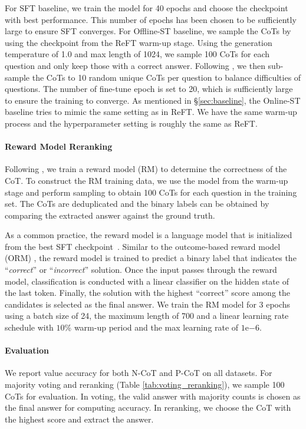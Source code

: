 For SFT baseline, we train the model for 40 epochs and choose the checkpoint with best performance. 
This number of epochs has been chosen to be sufficiently large to ensure SFT converges.
For Offline-ST baseline, we sample the CoTs by using the checkpoint from the ReFT warm-up stage.
Using the generation temperature of 1.0 and max length of 1024, we sample 100 CoTs for each question and only keep those with a correct answer. 
Following \citet{singh2023human}, we then sub-sample the CoTs to 10 random unique CoTs per question to balance difficulties of questions.
The number of fine-tune epoch is set to 20, which is sufficiently large to ensure the training to converge.
As mentioned in \S\ref{sec:baseline}, the Online-ST baseline tries to mimic the same setting as in ReFT. 
We have the same warm-up process and the hyperparameter setting is roughly the same as ReFT.

\paragraph{Reward Model Reranking}
\label{sec:reward_model_reranking}
Following \cite{cobbe2021training,uesato2022solving}, we train a reward model (RM) to determine the correctness of the CoT. 
To construct the RM training data, we use the model from the warm-up stage and perform sampling to obtain 100 CoTs for each question in the training set.
The CoTs are deduplicated and the binary labels can be obtained by comparing the extracted answer against the ground truth.

As a common practice, the reward model is a language model that is initialized from the best SFT checkpoint~\cite{cobbe2021training,ouyang2022training}. 
Similar to the outcome-based reward model (ORM) \cite{uesato2022solving}, the reward model is trained to predict a binary label that indicates the ``\textit{correct}'' or ``\textit{incorrect}'' solution. Once the input passes through the reward model, classification is conducted with a linear classifier on the hidden state of the last token. 
Finally, the solution with the highest ``correct'' score among the candidates is selected as the final answer. 
We train the RM model for 3 epochs using a batch size of 24, the maximum length of 700 and a linear learning rate schedule with $10$\% warm-up period and the max learning rate of $1$e$-6$.

\paragraph{Evaluation}
We report value accuracy for both N-CoT and P-CoT on all datasets. 
For majority voting and reranking (Table \ref{tab:voting_reranking}), we sample 100 CoTs for evaluation. 
In voting, the valid answer with majority counts is chosen as the final answer for computing accuracy.
In reranking, we choose the CoT with the highest score and extract the answer. 

